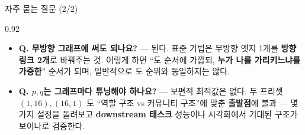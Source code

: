 \begin{frame}{자주 묻는 질문 (2/2)}
\begin{center}\begin{varwidth}{0.92\textwidth}
  \small
  \begin{itemize}
    \item \textbf{Q. 무방향 그래프에 써도 되나요?} --- 된다. 표준
      기법은 무방향 엣지 1개를 \textbf{방향 링크 2개}로 바꿔주는 것.
      이렇게 하면 ``도 순서에 가깝되, \textbf{누가 나를 가리키느냐를
      가중한}'' 순서가 되며, 일반적으로 도 순위와 동일하지는 않다.
    \item \textbf{Q. $p, q$는 그래프마다 튜닝해야 하나요?} ---
      보편적 최적값은 없다. 두 프리셋 $(1,16), (16,1)$ 도 ``역할
      구조 vs 커뮤니티 구조''에 맞춘 \textbf{출발점}에 불과 ---
      몇 가지 설정을 돌려보고 \textbf{downstream 태스크} 성능이나
      시각화에서 기대된 구조가 보이나로 검증한다.
  \end{itemize}
\end{varwidth}\end{center}
\end{frame}
